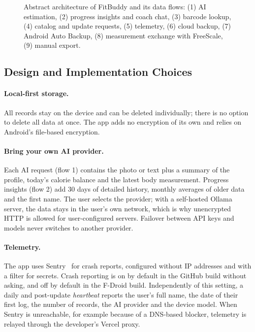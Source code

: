 \begin{figure}[htbp]
  \centering
  
  \caption{Abstract architecture of FitBuddy and its data flows: (1) AI estimation, (2) progress
  insights and coach chat, (3) barcode lookup, (4) catalog and update requests, (5) telemetry,
  (6) cloud backup, (7) Android Auto Backup, (8) measurement exchange with FreeScale, (9) manual
  export.}
  \label{fig:architecture}
\end{figure}

\subsection{Design and Implementation Choices}
\paragraph{Local-first storage.} All records stay on the device and can be deleted individually;
there is no option to delete all data at once. The app adds no encryption of its own and relies
on Android's file-based encryption.

\paragraph{Bring your own AI provider.} Each AI request (flow 1) contains the photo or text plus a
summary of the profile, today's calorie balance and the latest body measurement. Progress
insights (flow 2) add 30 days of detailed history, monthly averages of older data and the first
name. The user selects the provider; with a self-hosted Ollama server, the data stays in the
user's own network, which is why unencrypted HTTP is allowed for user-configured servers.
Failover between API keys and models never switches to another provider.

\paragraph{Telemetry.} The app uses Sentry~\cite{sentry-android} for crash reports, configured
without IP addresses and with a filter for secrets. Crash reporting is on by default in the
GitHub build without asking, and off by default in the F-Droid build. Independently of this
setting, a daily and post-update \emph{heartbeat} reports the user's full name, the date of their
first log, the number of records, the AI provider and the device model. When Sentry is
unreachable, for example because of a DNS-based blocker, telemetry is relayed through the
developer's Vercel proxy.

